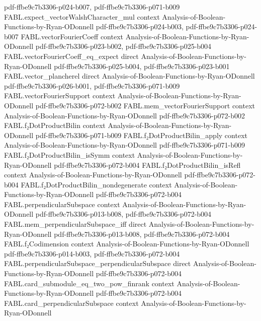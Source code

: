 \begin{theorem}
  {pdf-ffbe9c7b3306-p024-b007,
    pdf-ffbe9c7b3306-p071-b009}
\proofstep
  {FABL.expect_vectorWalshCharacter_mul}
  {context}
  {Analysis-of-Boolean-Functions-by-Ryan-ODonnell}
  {pdf-ffbe9c7b3306-p024-b003,
    pdf-ffbe9c7b3306-p024-b007}
\proofstep
  {FABL.vectorFourierCoeff}
  {context}
  {Analysis-of-Boolean-Functions-by-Ryan-ODonnell}
  {pdf-ffbe9c7b3306-p023-b002,
    pdf-ffbe9c7b3306-p025-b004}
\proofstep
  {FABL.vectorFourierCoeff_eq_expect}
  {direct}
  {Analysis-of-Boolean-Functions-by-Ryan-ODonnell}
  {pdf-ffbe9c7b3306-p025-b004,
    pdf-ffbe9c7b3306-p023-b001}
\proofstep
  {FABL.vector_plancherel}
  {direct}
  {Analysis-of-Boolean-Functions-by-Ryan-ODonnell}
  {pdf-ffbe9c7b3306-p026-b001,
    pdf-ffbe9c7b3306-p071-b009}
\proofstep
  {FABL.vectorFourierSupport}
  {context}
  {Analysis-of-Boolean-Functions-by-Ryan-ODonnell}
  {pdf-ffbe9c7b3306-p072-b002}
\proofstep
  {FABL.mem_vectorFourierSupport}
  {context}
  {Analysis-of-Boolean-Functions-by-Ryan-ODonnell}
  {pdf-ffbe9c7b3306-p072-b002}
\proofstep
  {FABL.f₂DotProductBilin}
  {context}
  {Analysis-of-Boolean-Functions-by-Ryan-ODonnell}
  {pdf-ffbe9c7b3306-p071-b009}
\proofstep
  {FABL.f₂DotProductBilin_apply}
  {context}
  {Analysis-of-Boolean-Functions-by-Ryan-ODonnell}
  {pdf-ffbe9c7b3306-p071-b009}
\proofstep
  {FABL.f₂DotProductBilin_isSymm}
  {context}
  {Analysis-of-Boolean-Functions-by-Ryan-ODonnell}
  {pdf-ffbe9c7b3306-p072-b004}
\proofstep
  {FABL.f₂DotProductBilin_isRefl}
  {context}
  {Analysis-of-Boolean-Functions-by-Ryan-ODonnell}
  {pdf-ffbe9c7b3306-p072-b004}
\proofstep
  {FABL.f₂DotProductBilin_nondegenerate}
  {context}
  {Analysis-of-Boolean-Functions-by-Ryan-ODonnell}
  {pdf-ffbe9c7b3306-p072-b004}
\proofstep
  {FABL.perpendicularSubspace}
  {context}
  {Analysis-of-Boolean-Functions-by-Ryan-ODonnell}
  {pdf-ffbe9c7b3306-p013-b008,
    pdf-ffbe9c7b3306-p072-b004}
\proofstep
  {FABL.mem_perpendicularSubspace_iff}
  {direct}
  {Analysis-of-Boolean-Functions-by-Ryan-ODonnell}
  {pdf-ffbe9c7b3306-p013-b008,
    pdf-ffbe9c7b3306-p072-b004}
\proofstep
  {FABL.f₂Codimension}
  {context}
  {Analysis-of-Boolean-Functions-by-Ryan-ODonnell}
  {pdf-ffbe9c7b3306-p014-b003,
    pdf-ffbe9c7b3306-p072-b004}
\proofstep
  {FABL.perpendicularSubspace_perpendicularSubspace}
  {direct}
  {Analysis-of-Boolean-Functions-by-Ryan-ODonnell}
  {pdf-ffbe9c7b3306-p072-b004}
\proofstep
  {FABL.card_submodule_eq_two_pow_finrank}
  {context}
  {Analysis-of-Boolean-Functions-by-Ryan-ODonnell}
  {pdf-ffbe9c7b3306-p072-b004}
\proofstep
  {FABL.card_perpendicularSubspace}
  {context}
  {Analysis-of-Boolean-Functions-by-Ryan-ODonnell}

\end{theorem}
